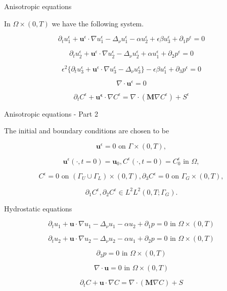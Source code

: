 \documentclass{beamer}
\begin{document}
\begin{frame}{Anisotropic equations}

  In $\Omega \times (0,T)$ we have the following system.

    \[ \partial_t u^\epsilon _1 + \mathbf{u}^\epsilon \cdot \nabla u^\epsilon _1 -\Delta_\nu u^\epsilon _1 -\alpha u_2^\epsilon + \epsilon \beta u_3^\epsilon + \partial_1 p^\epsilon = 0 \]
    
    \[ \partial_t u_2^\epsilon + \mathbf{u}^\epsilon \cdot \nabla u_2^\epsilon -\Delta_\nu u_2^\epsilon + \alpha u_1^\epsilon + \partial_2 p^\epsilon = 0 \]
    
    \[\epsilon^2 \{  \partial_t u_3^\epsilon + \mathbf{u}^\epsilon \cdot \nabla u_3^\epsilon -\Delta_\nu u_3^{\epsilon} \} - \epsilon \beta u_1^\epsilon + \partial_3 p^\epsilon = 0 \]
    
    \[ \nabla \cdot \mathbf{u}^\epsilon= 0  \]
    
    \[ \partial_t C^\epsilon + \mathbf{u^\epsilon} \cdot \nabla C^\epsilon = \nabla \cdot (\mathbf{M} \nabla C^\epsilon) + S^\epsilon \]
    
\end{frame}

\begin{frame}{Anisotropic equations - Part 2}

  The initial and boundary conditions are chosen to be

    \[ \mathbf{u}^\epsilon = 0 \text{ on } \Gamma \times (0,T), \]
    
    \[ \mathbf{u}^\epsilon (\cdot, t = 0) = \mathbf{u}_0, C^\epsilon (\cdot, t=0) = C^\epsilon_0  \text{ in } \Omega, \]

    $$C^\epsilon = 0 \text{ on } ( \Gamma_U \cup \Gamma_L) \times (0,T),  \partial_3 C^\epsilon = 0 \text{ on } \Gamma_G \times (0,T),$$
    
    $$\partial_1 C^\epsilon, \partial_2 C^\epsilon \in L^2 L^2 (0,T; \Gamma_G). $$

\end{frame}

\begin{frame}{Hydrostatic equations}
  
      \[ \partial_t u_1 + \mathbf{u} \cdot \nabla u_1 - \Delta_\nu u_1 -\alpha u_2 + \partial_1 p = 0 \text{ in } \Omega \times (0,T) \]
    
    \[ \partial_t u_2 + \mathbf{u} \cdot \nabla u_2 - \Delta_\nu u_2 -\alpha u_1 + \partial_2 p = 0 \text{ in } \Omega \times (0,T) \]
    
    \[ \partial_3 p = 0 \text{ in } \Omega \times (0,T) \]
    
    \[ \nabla \cdot \mathbf{u} = 0 \text{ in } \Omega \times (0,T) \]
    
    \[ \partial_t C + \mathbf{u} \cdot \nabla C = \nabla \cdot (\mathbf{M} \nabla C) + S \]

\end{frame}
    
\end{document}
